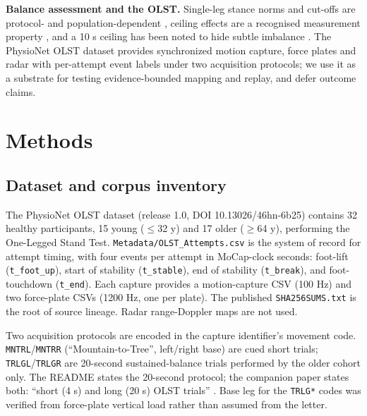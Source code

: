 \documentclass[11pt]{article}
\begin{document}
\textbf{Balance assessment and the OLST.} Single-leg stance norms and cut-offs are protocol- and population-dependent \citep{springer2007,bohannon2006,vereeck2008,araujo2022,beauchamp2022,chung2025}, ceiling effects are a recognised measurement property \citep{terwee2007,mokkink2010cosmin}, and a 10 s ceiling has been noted to hide subtle imbalance \citep{deabreu2024}. The PhysioNet OLST dataset \citep{copeland2026scidata,copeland2026gaitposture} provides synchronized motion capture, force plates and radar with per-attempt event labels under two acquisition protocols; we use it as a substrate for testing evidence-bounded mapping and replay, and defer outcome claims.

\section{Methods}\label{methods}

\subsection{Dataset and corpus inventory}\label{dataset-and-corpus-inventory}

The PhysioNet OLST dataset (release 1.0, DOI 10.13026/46hn-6b25) contains 32 healthy participants, 15 young ($\leq$32 y) and 17 older ($\geq$64 y), performing the One-Legged Stand Test. \texttt{Metadata/OLST\_Attempts.csv} is the system of record for attempt timing, with four events per attempt in MoCap-clock seconds: foot-lift (\texttt{t\_foot\_up}), start of stability (\texttt{t\_stable}), end of stability (\texttt{t\_break}), and foot-touchdown (\texttt{t\_end}). Each capture provides a motion-capture CSV (100 Hz) and two force-plate CSVs (1200 Hz, one per plate). The published \texttt{SHA256SUMS.txt} is the root of source lineage. Radar range-Doppler maps are not used.

Two acquisition protocols are encoded in the capture identifier's movement code. \texttt{MNTRL}/\texttt{MNTRR} (``Mountain-to-Tree'', left/right base) are cued short trials; \texttt{TRLGL}/\texttt{TRLGR} are 20-second sustained-balance trials performed by the older cohort only. The README states the 20-second protocol; the companion paper states both: ``short (4 s) and long (20 s) OLST trials'' \citep{copeland2026gaitposture}. Base leg for the \texttt{TRLG*} codes was verified from force-plate vertical load rather than assumed from the letter.
\end{document}
